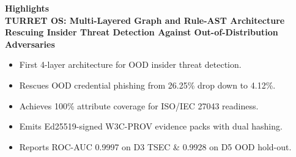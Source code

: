 \documentclass[11pt,a4paper]{article}
\begin{document}
\begin{center}
    {\Large \textbf{Highlights}} \\[1.5em]
    \textbf{TURRET OS: Multi-Layered Graph and Rule-AST Architecture Rescuing Insider Threat Detection Against Out-of-Distribution Adversaries}
\end{center}

\vspace{2em}

\begin{itemize}[leftmargin=*,itemsep=1.2em]
    \item First 4-layer architecture for OOD insider threat detection.
    \item Rescues OOD credential phishing from 26.25\% drop down to 4.12\%.
    \item Achieves 100\% attribute coverage for ISO/IEC 27043 readiness.
    \item Emits Ed25519-signed W3C-PROV evidence packs with dual hashing.
    \item Reports ROC-AUC 0.9997 on D3 TSEC \& 0.9928 on D5 OOD hold-out.
\end{itemize}
\end{document}
